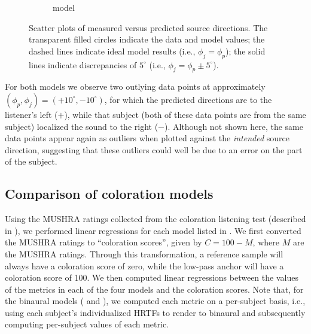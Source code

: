 \begin{figure}[t]
\begin{subfigure}[b]{0.49\columnwidth}
        \caption{\citet{Dietz2011} model}
        \label{fig:Dietz_Localization_Results}
  \end{subfigure}
  \caption[Scatter plots of measured versus predicted source directions.]{
  Scatter plots of measured versus predicted source directions.
  The transparent filled circles indicate the data and model values;
  the dashed lines indicate ideal model results (i.e., $\phi_j = \phi_p$);
  the solid lines indicate discrepancies of $5^\circ$ (i.e., $\phi_j = \phi_p \pm 5^\circ$).}
  \label{fig:Localization_Model_Comparison}
\end{figure}

For both models we observe two outlying data points at approximately $(\phi_p, \phi_j) = (+10^\circ, -10^\circ)$, for which the predicted directions are to the listener's left ($+$), while that subject (both of these data points are from the same subject) localized the sound to the right ($-$).
Although not shown here, the same data points appear again as outliers when plotted against the \textit{intended} source direction, suggesting that these outliers could well be due to an error on the part of the subject.

\subsection{Comparison of coloration models}\label{sec:05_Proposed_Models:Coloration_Results}
Using the MUSHRA ratings collected from the coloration listening test (described in ), we performed linear regressions for each model listed in .
We first converted the MUSHRA ratings to ``coloration scores'', given by $C = 100 - M$, where $M$ are the MUSHRA ratings.
Through this transformation, a reference sample will always have a coloration score of zero, while the low-pass anchor will have a coloration score of 100.
We then computed linear regressions between the values of the metrics in each of the four models and the coloration scores.
Note that, for the binaural models (\citet{Pulkki1999} and \citet{Wittek2007}), we computed each metric on a per-subject basis, i.e., using each subject's individualized HRTFs to render to binaural and subsequently computing per-subject values of each metric.


